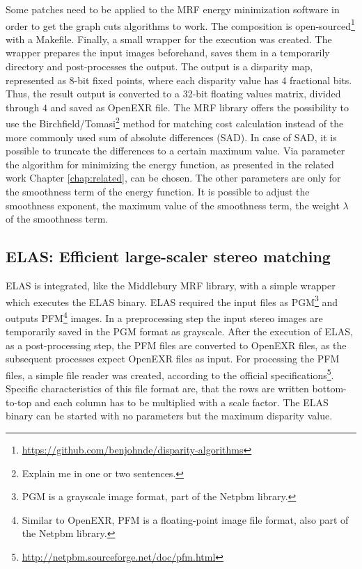 \noindent Some patches need to be applied to the MRF energy minimization software in order to get the graph cuts algorithms to work.
The composition is open-sourced\footnote{\url{https://github.com/benjohnde/disparity-algorithms}} with a Makefile.
Finally, a small wrapper for the execution was created.
The wrapper prepares the input images beforehand, saves them in a temporarily directory and post-processes the output.
The output is a disparity map, represented as 8-bit fixed points, where each disparity value has 4 fractional bits.
Thus, the result output is converted to a 32-bit floating values matrix, divided through $4$ and saved as OpenEXR file.
\newline\newline\noindent The MRF library offers the possibility to use the Birchfield/Tomasi\footnote{Explain me in one or two sentences.} method for matching cost calculation instead of the more commonly used sum of absolute differences (SAD).
In case of SAD, it is possible to truncate the differences to a certain maximum value.
Via parameter the algorithm for minimizing the energy function, as presented in the related work Chapter \ref{chap:related}, can be chosen.
The other parameters are only for the smoothness term of the energy function.
It is possible to adjust the smoothness exponent, the maximum value of the smoothness term, the weight $\lambda$ of the smoothness term.

\subsection*{ELAS: Efficient large-scaler stereo matching}

ELAS is integrated, like the Middlebury MRF library, with a simple wrapper which executes the ELAS binary.
ELAS required the input files as PGM\footnote{PGM is a grayscale image format, part of the Netpbm library.} and outputs PFM\footnote{Similar to OpenEXR, PFM is a floating-point image file format, also part of the Netpbm library.} images.
In a preprocessing step the input stereo images are temporarily saved in the PGM format as grayscale.
After the execution of ELAS, as a post-processing step, the PFM files are converted to OpenEXR files, as the subsequent processes expect OpenEXR files as input.
For processing the PFM files, a simple file reader was created, according to the official specifications\footnote{\url{http://netpbm.sourceforge.net/doc/pfm.html}}.
Specific characteristics of this file format are, that the rows are written bottom-to-top and each column has to be multiplied with a scale factor.
The ELAS binary can be started with no parameters but the maximum disparity value.

